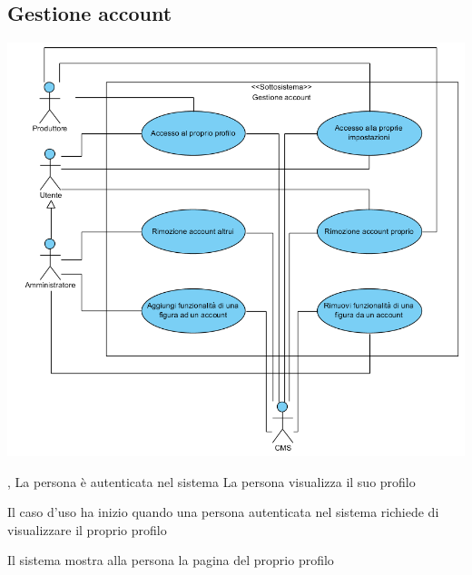 \subsection{Gestione account}
\begin{center}
   \includegraphics[width=\textwidth]{assets/visualParadigm/GestioneAccount}
\end{center}
{, }
{La persona è autenticata nel sistema}
{La persona visualizza il suo profilo}
{\begin{enumCU}
	\item Il caso d'uso ha inizio quando una persona autenticata nel sistema richiede di visualizzare il proprio profilo
	\item Il sistema mostra alla persona la pagina del proprio profilo
\end{enumCU}}

\tabcuvspace

